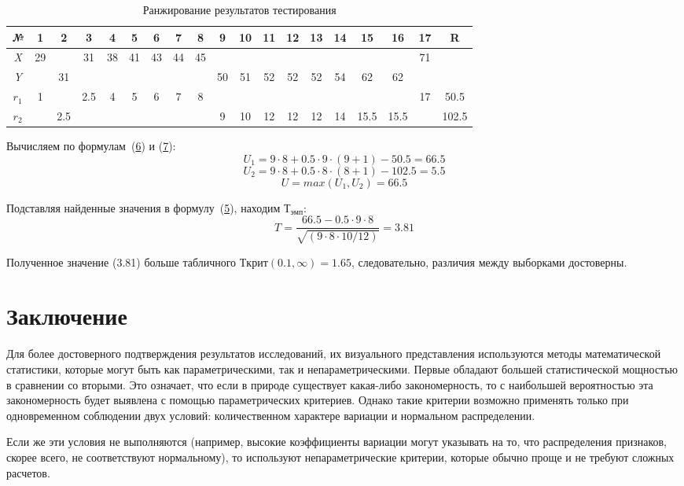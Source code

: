 \documentclass[12pt]{article}
\begin{document}
\begin{table}[h]
    \label{tbl:test-results-racked}
    \centering
    \caption{Ранжирование результатов тестирования}
    \bigskip
    \begin{tabular}{|c|c|c|c|c|c|c|c|c|c|c|c|c|c|c|c|c|c|c|} \hline
        \textit{№} &1&2&3&4&5&6&7&8&9&10&11&12&13&14&15&16&17&R \\ \hline
        \textit{X} &29&&31&38&41&43&44&45&&&&&&&&&71&  \\ \hline
        \textit{Y} &&31&&&&&&&50&51&52&52&52&54&62&62&&  \\  \hline
        \textit{$r_1$} &1&&2.5&4&5&6&7&8&&&&&&&&&17&50.5  \\  \hline
        \textit{$r_2$} &&2.5&&&&&&&9&10&12&12&12&14&15.5&15.5&&102.5  \\  \hline
    \end{tabular}
\end{table}

Вычисляем по формулам~(\hyperref[eq:u-1]{6}) и (\hyperref[eq:u-2]{7}):
$$
    U_1 = 9 \cdot 8 + 0.5 \cdot 9 \cdot (9+1) - 50.5 = 66.5
$$
$$
    U_2 = 9 \cdot 8 + 0.5 \cdot 8 \cdot (8+1) - 102.5 = 5.5   
$$
$$
    U = max(U_1, U_2) = 66.5
$$
  
Подставляя найденные значения в формулу~(\hyperref[eq:t-u]{5}), находим $Т_{эмп}$:
$$
    T =\frac{66.5 - 0.5 \cdot 9 \cdot 8}{\sqrt{(9 \cdot 8 \cdot 10/12)}} = 3.81
$$
  
Полученное значение (3.81) больше табличного $Ткрит(0.1, \infty) = 1.65$, следовательно, различия между выборками достоверны.

\medskip
\section*{Заключение}

\medskip
Для более достоверного подтверждения результатов исследований, их визуального представления используются методы математической статистики, которые могут быть как параметрическими, так и непараметрическими.
Первые обладают большей статистической мощностью в сравнении со вторыми. Это означает, что если в природе существует какая-либо закономерность, то с наибольшей вероятностью эта закономерность будет выявлена с помощью параметрических критериев. Однако такие критерии возможно применять только при одновременном соблюдении двух условий: количественном характере вариации и нормальном распределении.

Если же эти условия не выполняются (например, высокие коэффициенты вариации могут указывать на то, что распределения признаков, скорее всего, не соответствуют нормальному), то используют непараметрические критерии, которые обычно проще и не требуют сложных расчетов.
\end{document}
